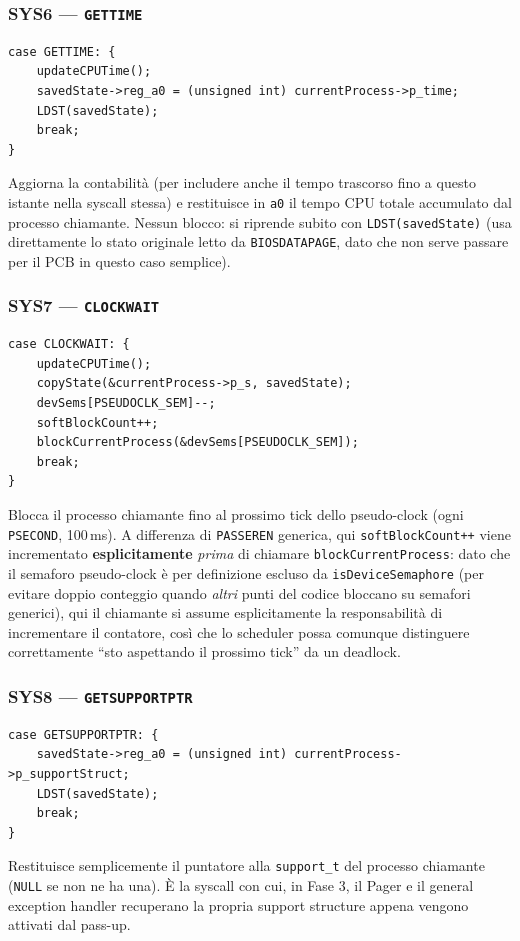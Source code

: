 \documentclass[11pt,a4paper]{article}
\newcommand{\code}[1]{\texttt{#1}}
\begin{document}
\subsubsection{SYS6 --- \code{GETTIME}}
\begin{lstlisting}
case GETTIME: {
    updateCPUTime();
    savedState->reg_a0 = (unsigned int) currentProcess->p_time;
    LDST(savedState);
    break;
}
\end{lstlisting}
Aggiorna la contabilità (per includere anche il tempo trascorso fino a
questo istante nella syscall stessa) e restituisce in \code{a0} il tempo
CPU totale accumulato dal processo chiamante. Nessun blocco: si riprende
subito con \code{LDST(savedState)} (usa direttamente lo stato originale
letto da \code{BIOSDATAPAGE}, dato che non serve passare per il PCB in
questo caso semplice).

\subsubsection{SYS7 --- \code{CLOCKWAIT}}
\begin{lstlisting}
case CLOCKWAIT: {
    updateCPUTime();
    copyState(&currentProcess->p_s, savedState);
    devSems[PSEUDOCLK_SEM]--;
    softBlockCount++;
    blockCurrentProcess(&devSems[PSEUDOCLK_SEM]);
    break;
}
\end{lstlisting}
Blocca il processo chiamante fino al prossimo tick dello pseudo-clock (ogni
\code{PSECOND}, 100\,ms). A differenza di \code{PASSEREN} generica, qui
\code{softBlockCount++} viene incrementato \textbf{esplicitamente} \emph{prima}
di chiamare \code{blockCurrentProcess}: dato che il semaforo pseudo-clock è
per definizione escluso da \code{isDeviceSemaphore} (per evitare doppio
conteggio quando \emph{altri} punti del codice bloccano su semafori
generici), qui il chiamante si assume esplicitamente la responsabilità di
incrementare il contatore, così che lo scheduler possa comunque distinguere
correttamente ``sto aspettando il prossimo tick'' da un deadlock.

\subsubsection{SYS8 --- \code{GETSUPPORTPTR}}
\begin{lstlisting}
case GETSUPPORTPTR: {
    savedState->reg_a0 = (unsigned int) currentProcess->p_supportStruct;
    LDST(savedState);
    break;
}
\end{lstlisting}
Restituisce semplicemente il puntatore alla \code{support\_t} del processo
chiamante (\code{NULL} se non ne ha una). È la syscall con cui, in Fase 3,
il Pager e il general exception handler recuperano la propria support
structure appena vengono attivati dal pass-up.
\end{document}
